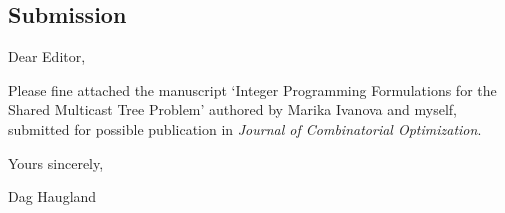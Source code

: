 \documentclass[12pt]{article}
\begin{document}
\begin{center}
\section*{Submission}
\end{center}

\vspace{2em}
\noindent
Dear Editor,

\vspace{4em}
\noindent
Please fine attached the manuscript `Integer Programming Formulations for the Shared Multicast Tree Problem'
authored by Marika Ivanova and myself, submitted for possible publication in \emph{Journal of Combinatorial Optimization}.

\vspace{1em}
\vspace{1em}
\vspace{1em}
\vspace{1em}
\vspace{1em}

\noindent
Yours sincerely,

\vspace{1em}
\vspace{1em}
\noindent
Dag Haugland
\end{document}
